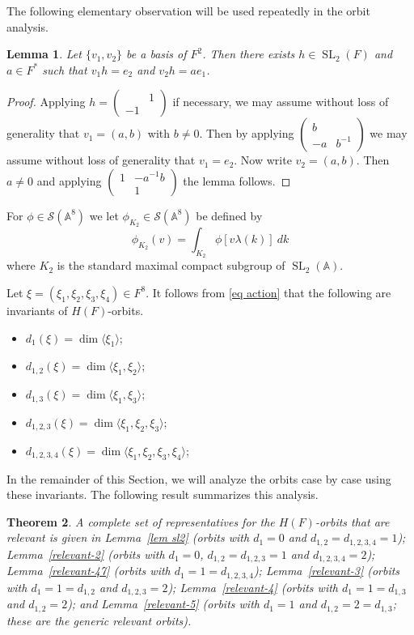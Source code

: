 \documentclass[12pt]{amsart}
\newcommand{\SL}{\operatorname{SL}}
\newcommand{\swrz}{\mathcal{S}}
\newcommand{\A}{\mathbb{A}}
\newcommand{\sm}[4]{\left(\begin{smallmatrix}{#1}&{#2}\\{#3}&{#4}\end{smallmatrix}\right)}
\newtheorem{theorem}{Theorem}[section]
\newtheorem{lemma}[theorem]{Lemma}
\theoremstyle{remark}
\begin{document}
The following elementary observation will be used repeatedly in the orbit analysis.
\begin{lemma}
Let $\{v_1,v_2\}$ be a basis of $F^2$. Then there exists $h\in \SL_2(F)$ and $a\in F^*$ such that $v_1 h=e_2$ and $v_2h=a e_1$.
\end{lemma}
\begin{proof}
Applying $h=\sm{}{1}{-1}{}$ if necessary, we may assume without loss of generality that $v_1=(a,b)$ with $b\ne 0$. Then by applying $\sm{b}{}{-a}{b^{-1}}$ we may assume without loss of generality that $v_1=e_2$. Now write $v_2= (a,b)$.  Then $a\ne 0$ and applying $\sm{1}{-a^{-1}b}{}{1}$ the lemma follows.  
\end{proof}

For $\phi\in \swrz(\A^8)$ we let $\phi_{K_2}\in \swrz(\A^8)$ be defined by
\[
\phi_{K_2}(v)=\int_{K_2}\phi[v\lambda(k)]\ dk
\]
where $K_2$ is the standard maximal compact subgroup of $\SL_2(\A)$.

Let $\xi=(\xi_1,\xi_2,\xi_3,\xi_4)\in F^8$. It follows from \eqref{eq action} that
the following are invariants of $H(F)$-orbits. 
\begin{itemize}
\item $d_1(\xi)=\dim \langle \xi_1 \rangle$;
\item $d_{1,2}(\xi)=\dim \langle \xi_1,\xi_2 \rangle$;
\item $d_{1,3}(\xi)=\dim \langle \xi_1,\xi_3 \rangle$;
\item $d_{1,2,3}(\xi)=\dim \langle \xi_1,\xi_2,\xi_3 \rangle$;
\item $d_{1,2,3,4}(\xi)=\dim \langle \xi_1,\xi_2,\xi_3,\xi_4 \rangle$;
\end{itemize}

In the remainder of this Section, we will analyze the orbits case by case using these invariants.  The following result summarizes this analysis.

\begin{theorem}\label{I-relevant-orbits}
 A complete set of representatives for the $H(F)$-orbits that are relevant is given in Lemma~\ref{lem sl2} (orbits with $d_1=0$ and $d_{1,2}=d_{1,2,3,4}=1$);
Lemma~\ref{relevant-2} (orbits with $d_1=0$, $d_{1,2}=d_{1,2,3}=1$ and $d_{1,2,3,4}=2$); Lemma~\ref{relevant-47} (orbits with $d_1=1=d_{1,2,3,4}$); 
Lemma~\ref{relevant-3} (orbits with $d_1=1=d_{1,2}$ and $d_{1,2,3}=2$); Lemma~\ref{relevant-4} (orbits with
$d_1=1=d_{1,3}$ and $d_{1,2}=2$); and Lemma~\ref{relevant-5} (orbits with $d_1=1$ and $d_{1,2}=2=d_{1,3}$; these are the generic relevant orbits).  
\end{theorem}
\end{document}
